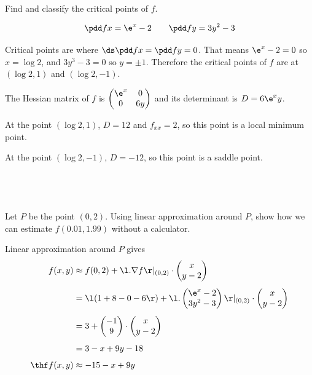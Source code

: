 \documentclass[a4paper]{article}
\begin{document}
\begin{questionbody}
Find and classify the critical points of $f$.
\end{questionbody}%
%
$$\pdd fx = \e^x - 2 \qquad \pdd fy = 3y^2 - 3$$

Critical points are where $\ds \pdd fx = \pdd fy = 0$. That means $\e^x - 2 = 0$ so $x = \log 2$, and $3y^3 - 3 = 0$ so $y = \pm 1$. Therefore the critical points of $f$ are at $(\log 2, 1)$ and $(\log 2, -1)$.

The Hessian matrix of $f$ is $\begin{pmatrix} \e^x & 0\\ 0 & 6y \end{pmatrix}$ and its determinant is $D = 6 \e^x y$.

At the point $(\log 2, 1)$, $D = 12$ and $f_{xx} = 2$, so this point is a local minimum point.

At the point $(\log 2, -1)$, $D = -12$, so this point is a saddle point.

\subsection{~} %

\begin{questionbody}
Let $P$ be the point $(0, 2)$. Using linear approximation around $P$, show how we can estimate $f(0.01, 1.99)$ without a calculator.
\end{questionbody}

Linear approximation around $P$ gives \begin{align*}
f(x, y) &\approx f(0, 2) + \l. \nabla f \r|_{(0,2)} \cdot \begin{pmatrix}x\\ y-2\end{pmatrix}\\[1ex]
&= \l( 1 + 8 - 0 - 6 \r) + \l. \begin{pmatrix}\e^x - 2\\ 3y^2 - 3\end{pmatrix} \r|_{(0,2)} \cdot \begin{pmatrix}x\\ y-2\end{pmatrix}\\[1ex]
&= 3 + \begin{pmatrix}-1\\ 9\end{pmatrix} \cdot \begin{pmatrix}x\\ y-2\end{pmatrix}\\[1ex]
&= 3 -x + 9y - 18\\[1ex]
\thf f(x, y) &\approx -15 -x + 9y
\end{align*}
\end{document}
